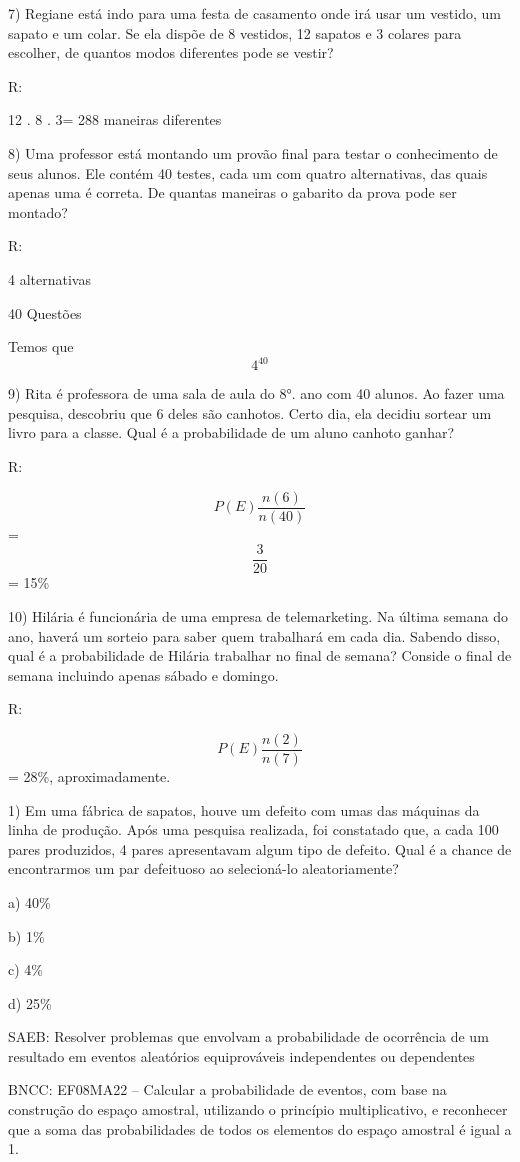 7) Regiane está indo para uma festa de casamento onde irá usar um
vestido, um sapato e um colar. Se ela dispõe de 8 vestidos, 12 sapatos e
3 colares para escolher, de quantos modos diferentes pode se vestir?

R:

12 . 8 . 3= 288 maneiras diferentes

8) Uma professor está montando um provão final para testar o
conhecimento de seus alunos. Ele contém 40 testes, cada um com quatro
alternativas, das quais apenas uma é correta. De quantas maneiras o
gabarito da prova pode ser montado?

R:

4 alternativas

40 Questões

Temos que \[4^{40}\]

9) Rita é professora de uma sala de aula do 8°. ano com 40 alunos. Ao
fazer uma pesquisa, descobriu que 6 deles são canhotos. Certo dia, ela
decidiu sortear um livro para a classe. Qual é a probabilidade de um
aluno canhoto ganhar?

R:

\[P(E)\frac{n(6)}{n(40)}\] = \[\frac{3}{20}\] = 15\%

10) Hilária é funcionária de uma empresa de telemarketing. Na última
semana do ano, haverá um sorteio para saber quem trabalhará em cada dia.
Sabendo disso, qual é a probabilidade de Hilária trabalhar no final de
semana? Conside o final de semana incluindo apenas sábado e domingo.

R:

\[P(E)\frac{n(2)}{n(7)}\] = 28\%, aproximadamente.


1) Em uma fábrica de sapatos, houve um defeito com umas das máquinas da
linha de produção. Após uma pesquisa realizada, foi constatado que, a
cada 100 pares produzidos, 4 pares apresentavam algum tipo de defeito.
Qual é a chance de encontrarmos um par defeituoso ao selecioná-lo
aleatoriamente?

a) 40\%

b) 1\%

c) 4\%

d) 25\%

SAEB: Resolver problemas que envolvam a probabilidade de ocorrência de
um resultado em eventos aleatórios equiprováveis independentes ou
dependentes

BNCC: EF08MA22 -- Calcular a probabilidade de eventos, com base na
construção do espaço amostral, utilizando o princípio multiplicativo, e
reconhecer que a soma das probabilidades de todos os elementos do espaço
amostral é igual a 1.

